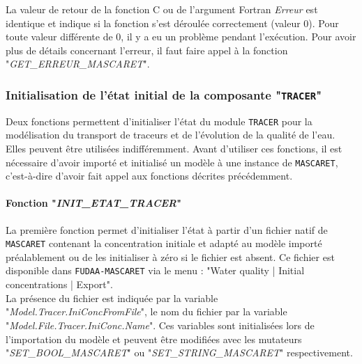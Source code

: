 \documentclass[a4paper,11pt]{article}
\begin{document}
\vspace{0.5cm}
  La valeur de retour de la fonction C ou de l'argument Fortran
  \textit{Erreur} est identique et indique si la fonction s'est
  d\'eroul\'ee correctement (valeur 0). Pour toute valeur diff\'erente
  de 0, il y a eu un probl\`eme pendant l'ex\'ecution. Pour avoir plus
  de d\'etails concernant l'erreur, il faut faire appel \`a la
  fonction "\textit{GET\_ERREUR\_MASCARET}".

\subsubsection{Initialisation de l'\'etat initial de la composante "\texttt{TRACER}"}

 \label{InitTracer}

 Deux fonctions permettent d'initialiser l'\'etat du module
 \texttt{TRACER} pour la mod\'elisation du transport de traceurs et de
 l'\'evolution de la qualit\'e de l'eau. Elles peuvent \^etre
 utilis\'ees indiff\'eremment. Avant d'utiliser ces fonctions, il est
 n\'ecessaire d'avoir import\'e et initialis\'e un mod\`ele \`a une instance de \texttt{MASCARET}, c'est-\`a-dire d'avoir fait appel aux fonctions d\'ecrites pr\'ec\'edemment.
 
 \vspace{0.5cm}

 \paragraph{Fonction "\textit{INIT\_ETAT\_TRACER}"\\}

 \hspace*{1cm}

 La premi\`ere fonction permet d'initialiser l'\'etat \`a partir d'un
 fichier natif de \texttt{MASCARET} contenant la concentration
 initiale et adapt\'e au mod\`ele import\'e pr\'ealablement ou de les
 initialiser \`a z\'ero si le fichier est absent. Ce fichier est
 disponible dans \texttt{FUDAA-MASCARET} via le menu : "Water quality |
 Initial concentrations | Export".\\
 La pr\'esence du fichier est indiqu\'ee par la variable
 "\textit{Model.Tracer.IniConcFromFile}", le nom du fichier par la variable
 "\textit{Model.File.Tracer.IniConc.Name}". Ces variables sont
 initialis\'ees lors de l'importation du mod\`ele et peuvent \^etre
 modifi\'ees avec les mutateurs "\textit{SET\_BOOL\_MASCARET}" ou
 "\textit{SET\_STRING\_MASCARET}" respectivement.
 
\end{document}
